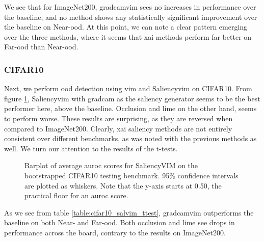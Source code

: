 \documentclass[UKenglish]{uiomasterthesis} %
\theoremstyle{definition}
\begin{document}
We see that for ImageNet200, \ac{gradcam}\ac{vim} sees no increases in performance over the baseline, and no method shows any statistically significant improvement over the baseline on Near-\ac{ood}. At this point, we can note a clear pattern emerging over the three methods, where it seems that \ac{xai} methods perform far better on Far-\ac{ood} than Near-\ac{ood}.

\subsubsection{CIFAR10}

Next, we perform \ac{ood} detection using \ac{vim} and Saliency\ac{vim} on CIFAR10. From figure \ref{fig:cifar10_salvim_bootstrap_barplot}, Saliency\ac{vim} with \ac{gradcam} as the saliency generator seems to be the best performer here, above the baseline. Occlusion and \ac{lime} on the other hand, seems to perform worse. These results are surprising, as they are reversed when compared to ImageNet200. Clearly, \ac{xai} saliency methods are not entirely consistent over different benchmarks, as was noted with the previous methods as well. We turn our attention to the results of the t-tests.

\begin{figure}[H]
    \begin{center}
        
    \end{center}
    \caption[CIFAR10 SaliencyVIM Bootstrap]{Barplot of average \ac{auroc} scores for SaliencyVIM on the bootstrapped CIFAR10 testing benchmark. 95\% confidence intervals are plotted as whiskers. Note that the y-axis starts at 0.50, the practical floor for an \ac{auroc} score.}
    \label{fig:cifar10_salvim_bootstrap_barplot}
\end{figure}

As we see from table \ref{table:cifar10_salvim_ttest}, \ac{gradcam}\ac{vim} outperforms the baseline on both Near- and Far-\ac{ood}. Both occlusion and \ac{lime} see drops in performance across the board, contrary to the results on ImageNet200.
\end{document}
